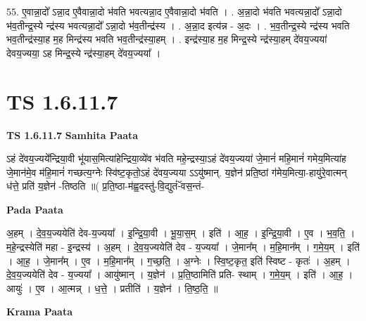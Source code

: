 \documentclass[17pt]{extarticle}
\begin{document}
55. ए॒वान्ना॒दो᳚ ऽन्ना॒द ए॒वैवान्ना॒दो भ॑वति भवत्यन्ना॒द ए॒वैवान्ना॒दो भ॑वति । . अ॒न्ना॒दो भ॑वति भवत्यन्ना॒दो᳚ ऽन्ना॒दो भ॑व॒तीन्द्र॒स्ये न्द्र॑स्य भवत्यन्ना॒दो᳚ ऽन्ना॒दो भ॑व॒तीन्द्र॑स्य । . अ॒न्ना॒द इत्य॑न्न - अ॒दः । . भ॒व॒तीन्द्र॒स्ये न्द्र॑स्य भवति भव॒तीन्द्र॑स्या॒ह म॒ह मिन्द्र॑स्य भवति भव॒तीन्द्र॑स्या॒हम् । . इन्द्र॑स्या॒ह म॒ह मिन्द्र॒स्ये न्द्र॑स्या॒हम् दे॑वय॒ज्यया॑ देवय॒ज्यया॒ ऽह मिन्द्र॒स्ये न्द्र॑स्या॒हम् दे॑वय॒ज्यया᳚ । \newline
\pagebreak
{}
\section*{ TS 1.6.11.7 }

\textbf{TS 1.6.11.7 } \newline
\textbf{Samhita Paata} \newline

ऽहं दे॑वय॒ज्यये᳚न्द्रिया॒वी भू॑यास॒मित्या॑हेन्द्रिया॒व्ये॑व भ॑वति महे॒न्द्रस्या॒ऽहं दे॑वय॒ज्यया॑ जे॒मानं॑ महि॒मानं॑ गमेय॒मित्या॑ह जे॒मान॑मे॒व म॑हि॒मानं॑ गच्छत्य॒ग्नेः स्वि॑ष्ट॒कृतो॒ऽहं दे॑वय॒ज्यया ऽऽयु॑ष्मान्. य॒ज्ञेन॑ प्रति॒ष्ठां ग॑मेय॒मित्या॒-हायु॑रे॒वात्मन् ध॑त्ते॒ प्रति॑ य॒ज्ञेन॑ -तिष्ठति ॥( प्र॒ति॒ष्ठा-म॑ह्व॒दस्तु॑-वि॒द्युतं॑-ॅवस॒न्तं- \newline

\textbf{Pada Paata} \newline

अ॒हम् । दे॒व॒य॒ज्ययेति॑ देव-य॒ज्यया᳚ । इ॒न्द्रि॒या॒वी । भू॒या॒स॒म् । इति॑ । आ॒ह॒ । इ॒न्द्रि॒या॒वी । ए॒व । भ॒व॒ति॒ । म॒हे॒न्द्रस्येति॑ महा - इ॒न्द्रस्य॑ । अ॒हम् । दे॒व॒य॒ज्ययेति॑ देव - य॒ज्यया᳚ । जे॒मान᳚म् । म॒हि॒मान᳚म् । ग॒मे॒य॒म् । इति॑ । आ॒ह॒ । जे॒मान᳚म् । ए॒व । म॒हि॒मान᳚म् । ग॒च्छ॒ति॒ । अ॒ग्नेः । स्वि॒ष्ट॒कृत॒ इति॑ स्विष्ट - कृतः॑ । अ॒हम् । दे॒व॒य॒ज्ययेति॑ देव - य॒ज्यया᳚ । आयु॑ष्मान् । य॒ज्ञेन॑ । प्र॒ति॒ष्ठामिति॑ प्रति- स्थाम् । ग॒मे॒य॒म् । इति॑ । आ॒ह॒ । आयुः॑ । ए॒व । आ॒त्मन्न् । ध॒त्ते॒ । प्रतीति॑ । य॒ज्ञेन॑ । ति॒ष्ठ॒ति॒ ॥  \newline


\textbf{Krama Paata} \newline
\end{document}
